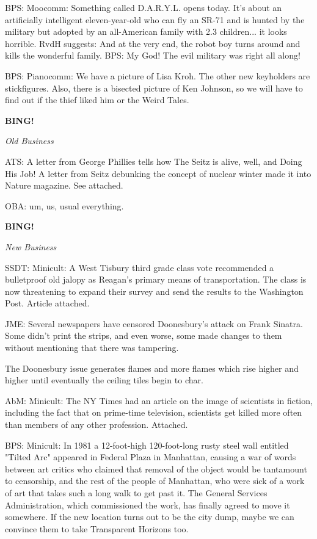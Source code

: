 \documentclass[12pt]{article}
\newcommand{\bing}{{\bf BING!} }
\newcommand{\goto}[1]{\bing \vskip 12pt \centerline{{\em{#1}}}}
\begin{document}
BPS: Moocomm: Something called D.A.R.Y.L. opens today. It's about an artificially intelligent eleven-year-old who can fly an SR-71 and is hunted by the military but adopted by an all-American family with 2.3 children... it looks horrible. RvdH suggests: And at the very end, the robot boy turns around and kills the wonderful family. BPS: My God! The evil military was right all along!

BPS: Pianocomm: We have a picture of Lisa Kroh. The other new keyholders are stickfigures. Also, there is a bisected picture of Ken Johnson, so we will have to find out if the thief liked him or the Weird Tales.

\goto{Old Business}

ATS: A letter from George Phillies tells how The Seitz is alive, well, and Doing His Job! A letter from Seitz debunking the concept of nuclear winter made it into Nature magazine. See attached.

OBA: um, us, usual everything.

\goto{New Business}

SSDT: Minicult: A West Tisbury third grade class vote recommended a bulletproof old jalopy as Reagan's primary means of transportation. The class is now threatening to expand their survey and send the results to the Washington Post. Article attached.

JME: Several newspapers have censored Doonesbury's attack on Frank Sinatra. Some didn't print the strips, and even worse, some made changes to them without mentioning that there was tampering.

The Doonesbury issue generates flames and more flames which rise higher and higher until eventually the ceiling tiles begin to char.

AbM: Minicult: The NY Times had an article on the image of scientists in fiction, including the fact that on prime-time television, scientists get killed more often than members of any other profession. Attached.

BPS: Minicult: In 1981 a 12-foot-high 120-foot-long rusty steel wall entitled "Tilted Arc" appeared in Federal Plaza in Manhattan, causing a war of words between art critics who claimed that removal of the object would be tantamount to censorship, and the rest of the people of Manhattan, who were sick of a work of art that takes such a long walk to get past it. The General Services Administration, which commissioned the work, has finally agreed to move it somewhere. If the new location turns out to be the city dump, maybe we can convince them to take Transparent Horizons too.
\end{document}
